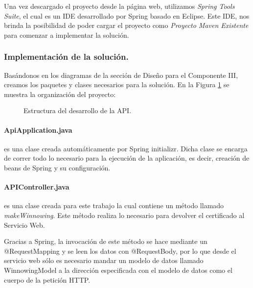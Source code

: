 \documentclass[12pt, a4paper, titlepage]{report}
\begin{document}
	            
	                Una vez descargado el proyecto desde la página web, utilizamos \textit{Spring Tools Suite}, el cual es un IDE desarrollado por Spring basado en Eclipse. Este IDE, nos brinda la posibilidad de poder cargar el proyecto como \textit{Proyecto Maven Existente} para comenzar a implementar la solución.
	                
	           \subsubsection{Implementación de la solución.}
	                Basándonos en los diagramas de la sección de Diseño para el Componente III, creamos los paquetes y clases necesarios para la solución. En la Figura \ref{fig:estructuraAPI} se muestra la organización del proyecto: 
	                
	                \begin{figure}[H]
                		\begin{center}
                		\caption{Estructura del desarrollo de la API.}
        	            \label{fig:estructuraAPI}
        	            \end{center}
        	        \end{figure} 
        	        
        	        \paragraph{ApiApplication.java} es una clase creada automáticamente por Spring initializr. Dicha clase se encarga de correr todo lo necesario para la ejecución de la aplicación, es decir, creación de beans de Spring y su configuración.
        	        
        	        \paragraph{APIController.java} es una clase creada para este trabajo la cual contiene un método llamado \textit{makeWinnowing}. Este método realiza lo necesario para devolver el certificado al Servicio Web. 
        	        
        	        Gracias a Spring, la invocación de este método se hace mediante un @RequestMapping y se leen los datos con @RequestBody, por lo que desde el servicio web sólo es necesario mandar un modelo de datos llamado WinnowingModel a la dirección especificada con el modelo de datos como el cuerpo de la petición HTTP. 
        	        
\end{document}
